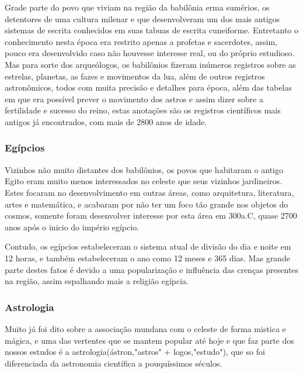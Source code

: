 Grade parte do povo que viviam na região da babilônia erma sumérios, os detentores de uma cultura milenar e que desenvolveram um dos mais antigos sistemas de escrita conhecidos em suas tabuas de escrita cuneiforme. Entretanto o conhecimento nesta época era restrito apenas a profetas e sacerdotes, assim, pouco era desenvolvido caso não houvesse interesse real, ou do próprio estudioso. Mas para sorte dos arqueólogos, os babilônios fizeram inúmeros registros sobre as estrelas, planetas, as fazes e movimentos da lua, além de outros registros astronômicos, todos com muita precisão e detalhes para época, além das tabelas em que era possível prever o movimento dos astros e assim dizer sobre a fertilidade e sucesso do reino, estas anotações são os registros científicos mais antigos já encontrados, com mais de 2800 anos de idade.
\subsubsection*{Egípcios}
Vizinhos não muito distantes dos babilônios, os povos que habitaram o antigo Egito eram muito menos interessados no celeste que seus vizinhos jardineiros. Estes focaram no desenvolvimento em outras áreas, como arquitetura, literatura, artes e matemática, e acabaram por não ter um foco tão grande nos objetos do cosmos, somente foram desenvolver interesse por esta área em 300a.C, quase 2700 anos após o inicio do império egípcio.

Contudo, os egípcios estabeleceram o sistema atual de divisão do dia e noite em 12 horas, e também estabeleceram o ano como 12 meses e 365 dias. Mas grande parte destes fatos é devido a uma popularização e influência das crenças presentes na região, assim espalhando mais a religião egípcia.
\subsubsection*{Astrologia}
Muito já foi dito sobre a associação mundana com o celeste de forma mistica e mágica, e uma das vertentes que se mantem popular até hoje e que faz parte dos nossos estudos é a astrologia(ástron,"astros" + logos,"estudo"), que so foi diferenciada da astronomia científica a pouquíssimos séculos.

